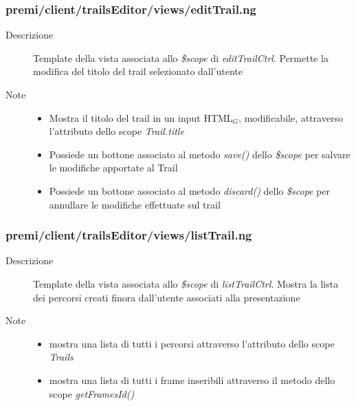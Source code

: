 \subsubsection{premi/client/trailsEditor/views/editTrail.ng}

\begin{description}
\item[Descrizione] \hfill
	Template della vista associata allo \textit{\$scope} di \textit{editTrailCtrl}. Permette la modifica del titolo del trail selezionato dall'utente
\item[Note] \hfill
	\begin{itemize}
			\item Mostra il titolo del trail in un input HTML$_G$, modificabile, attraverso l'attributo dello scope \textit{Trail.title}
			\item Possiede un bottone associato al metodo \textit{save()} dello \textit{\$scope} per salvare le modifiche apportate al Trail
			\item Possiede un bottone associato al metodo \textit{discard()} dello \textit{\$scope} per annullare le modifiche effettuate sul trail
	\end{itemize}
\end{description}


\subsubsection{premi/client/trailsEditor/views/listTrail.ng}

\begin{description}
\item[Descrizione] \hfill
	Template della vista associata allo \textit{\$scope} di \textit{listTrailCtrl}. Mostra la lista dei percorsi creati finora dall'utente associati alla presentazione
\item[Note] \hfill
	\begin{itemize}
			\item mostra una lista di tutti i percorsi attraverso l'attributo dello scope \textit{Trails}
			\item mostra una lista di tutti i frame inseribili attraverso il metodo dello scope \textit{getFramesId()}
	\end{itemize}
\end{description}

